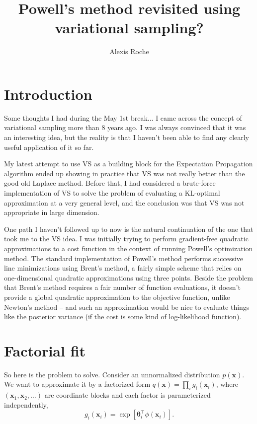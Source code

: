 \documentclass{article}
\title{Powell's method revisited using variational sampling?}
\author{Alexis Roche}
\def\x{{\mathbf{x}}}
\def\param{{\boldsymbol{\theta}}}
\begin{document}
\maketitle      

\section{Introduction}

Some thoughts I had during the May 1st break... I came across the concept of variational sampling more than 8 years ago. I was always convinced that it was an interesting idea, but the reality is that I haven't been able to find any clearly useful application of it so far. 

My latest attempt to use VS as a building block for the Expectation Propagation algorithm ended up showing in practice that VS was not really better than the good old Laplace method. Before that, I had considered a brute-force implementation of VS to solve the problem of evaluating a KL-optimal approximation at a very general level, and the conclusion was that VS was not appropriate in large dimension.

One path I haven't followed up to now is the natural continuation of the one that took me to the VS idea. I was initially trying to perform gradient-free quadratic approximations to a cost function in the context of running Powell's optimization method. The standard implementation of Powell's method performs successive line minimizations using Brent's method, a fairly simple scheme that relies on one-dimensional quadratic approximations using three points. Beside the problem that Brent's method requires a fair number of function evaluations, it doesn't provide a global quadratic approximation to the objective function, unlike Newton's method -- and such an approximation would be nice to evaluate things like the posterior variance (if the cost is some kind of log-likelihood function).

\section{Factorial fit}

So here is the problem to solve. Consider an unnormalized distribution $p(\x)$. We want to approximate it by a factorized form $q(\x) = \prod_i g_i(\x_i)$, where $(\x_1,\x_2,\ldots)$ are coordinate blocks and each factor is parameterized independently, 
$$
g_i(\x_i) = \exp [\param_i^\top \phi(\x_i)]
.
$$
\end{document}
